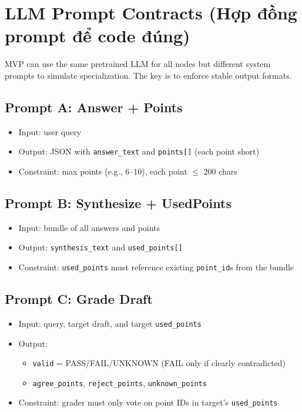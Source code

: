 \documentclass[11pt]{article}
\begin{document}
\section{LLM Prompt Contracts (Hợp đồng prompt để code đúng)}
MVP can use the same pretrained LLM for all nodes but different system prompts to simulate specialization.
The key is to enforce stable output formats.

\subsection{Prompt A: Answer + Points}
\begin{itemize}[leftmargin=1.2em]
  \item Input: user query
  \item Output: JSON with \texttt{answer\_text} and \texttt{points[]} (each point short)
  \item Constraint: max points (e.g., 6--10), each point \(\le\) 200 chars
\end{itemize}

\subsection{Prompt B: Synthesize + UsedPoints}
\begin{itemize}[leftmargin=1.2em]
  \item Input: bundle of all answers and points
  \item Output: \texttt{synthesis\_text} and \texttt{used\_points[]}
  \item Constraint: \texttt{used\_points} must reference existing \texttt{point\_id}s from the bundle
\end{itemize}

\subsection{Prompt C: Grade Draft}
\begin{itemize}[leftmargin=1.2em]
  \item Input: query, target draft, and target \texttt{used\_points}
  \item Output:
  \begin{itemize}[leftmargin=1.2em]
    \item \texttt{valid} = PASS/FAIL/UNKNOWN (FAIL only if clearly contradicted)
    \item \texttt{agree\_points}, \texttt{reject\_points}, \texttt{unknown\_points}
  \end{itemize}
  \item Constraint: grader must only vote on point IDs in target's \texttt{used\_points}
\end{itemize}
\end{document}
